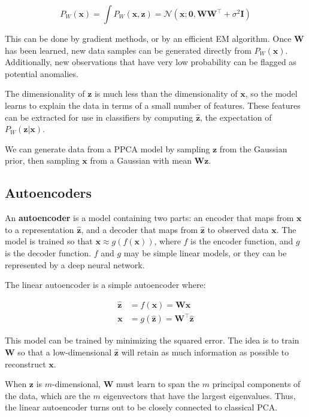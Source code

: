 \documentclass{article}
\renewcommand{\vec}[1]{\textbf{#1}}
\begin{document}
\[
P_W(\vec{x}) = \int P_W(\vec{x}, \vec{z}) = \mathcal{N}(\vec{x}; \vec{0}, \vec{W}\vec{W}^\top + \sigma^2\vec{I})
\]

This can be done by gradient methods, or by an efficient EM algorithm. Once $\vec{W}$
has been learned, new data samples can be generated directly from $P_W(\vec{x})$.
Additionally, new observations that have very low probability can be flagged as 
potential anomalies.

The dimensionality of $\vec{z}$ is much less than the dimensionality of $\vec{x}$,
so the model learns to explain the data in terms of a small number of features. These
features can be extracted for use in classifiers by computing $\mathbf{\hat z}$, the
expectation of $P_W(\vec{z} | \vec{x})$.

We can generate data from a PPCA model by sampling $\vec{z}$ from the Gaussian prior,
then sampling $\vec{x}$ from a Gaussian with mean $\vec{Wz}$. 

\subsection{Autoencoders}

An \textbf{autoencoder} is a model containing two parts: an encoder that maps from
$\vec{x}$ to a representation $\mathbf{\hat z}$, and a decoder that maps from
$\mathbf{\hat z}$ to observed data $\vec{x}$. The model is trained so that
$\vec{x} \approx g(f(\vec{x}))$, where $f$ is the encoder function, and $g$ is the
decoder function. $f$ and $g$ may be simple linear models, or they can be represented
by a deep neural network.

The linear autoencoder is a simple autoencoder where:

\begin{align*}
    \mathbf{\hat z} &= f(\vec{x}) = \vec{W} \vec{x} \\
    \vec{x} &= g(\mathbf{\hat z}) = \vec{W}^\top \mathbf{\hat z}
\end{align*}

This model can be trained by minimizing the squared error. The idea is to train 
$\vec{W}$ so that a low-dimensional $\mathbf{\hat z}$ will retain as much information
as possible to reconstruct $\vec{x}$.

When $\vec{z}$ is $m$-dimensional, $\vec{W}$ must learn to span the $m$ principal
components of the data, which are the $m$ eigenvectors that have the largest
eigenvalues. Thus, the linear autoencoder turns out to be closely connected to
classical PCA.
\end{document}
